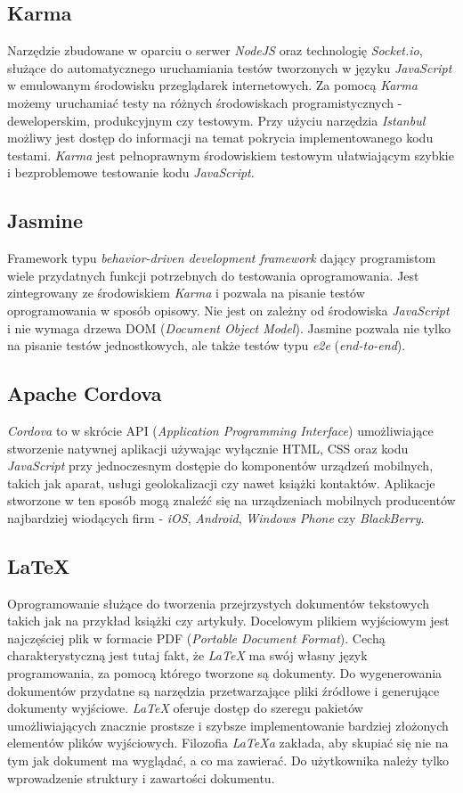 \subsection{Karma}
Narzędzie zbudowane w oparciu o serwer \textit{NodeJS} oraz technologię \textit{Socket.io}, służące do automatycznego uruchamiania testów tworzonych w języku \textit{JavaScript} w emulowanym środowisku przeglądarek internetowych. Za pomocą \textit{Karma} możemy uruchamiać testy na różnych środowiskach programistycznych - deweloperskim, produkcyjnym czy testowym. Przy użyciu narzędzia \textit{Istanbul} możliwy jest dostęp do informacji na temat pokrycia implementowanego kodu testami. \textit{Karma} jest pełnoprawnym środowiskiem testowym ułatwiającym szybkie i bezproblemowe testowanie kodu \textit{JavaScript}.

\subsection{Jasmine}
Framework typu \textit{behavior-driven development framework} dający programistom wiele przydatnych funkcji potrzebnych do testowania oprogramowania. Jest zintegrowany ze środowiskiem \textit{Karma} i pozwala na pisanie testów oprogramowania w sposób opisowy. Nie jest on zależny od środowiska \textit{JavaScript} i nie wymaga drzewa DOM (\textit{Document Object Model}). Jasmine pozwala nie tylko na pisanie testów jednostkowych, ale także testów typu \textit{e2e} (\textit{end-to-end}). 

\subsection{Apache Cordova}
\textit{Cordova} to w skrócie API (\textit{Application Programming Interface}) umożliwiające stworzenie natywnej aplikacji używając wyłącznie HTML, CSS oraz kodu \textit{JavaScript} przy jednoczesnym dostępie do komponentów urządzeń mobilnych, takich jak aparat, usługi geolokalizacji czy nawet książki kontaktów. Aplikacje stworzone w ten sposób mogą znaleźć się na urządzeniach mobilnych producentów najbardziej wiodących firm - \textit{iOS}, \textit{Android}, \textit{Windows Phone} czy \textit{BlackBerry}.

\subsection{LaTeX}
Oprogramowanie służące do tworzenia przejrzystych dokumentów tekstowych takich jak na przykład książki czy artykuły. Docelowym plikiem wyjściowym jest najczęściej plik w formacie PDF (\textit{Portable Document Format}). Cechą charakterystyczną jest tutaj fakt, że \textit{LaTeX} ma swój własny język programowania, za pomocą którego tworzone są dokumenty. Do wygenerowania dokumentów przydatne są narzędzia przetwarzające pliki źródłowe i generujące dokumenty wyjściowe. \textit{LaTeX} oferuje dostęp do szeregu pakietów umożliwiających znacznie prostsze i szybsze implementowanie bardziej złożonych elementów plików wyjściowych. Filozofia \textit{LaTeXa} zakłada, aby skupiać się nie na tym jak dokument ma wyglądać, a co ma zawierać. Do użytkownika należy tylko wprowadzenie struktury i zawartości dokumentu. 

